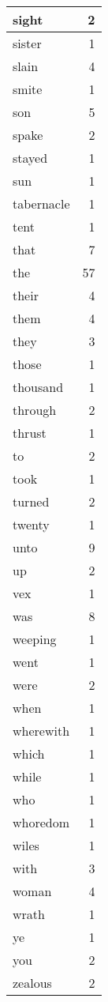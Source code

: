 \begin{center}
\begin{longtable}{l|r}
sight & 2\\ \hline 
sister & 1\\ \hline 
slain & 4\\ \hline 
smite & 1\\ \hline 
son & 5\\ \hline 
spake & 2\\ \hline 
stayed & 1\\ \hline 
sun & 1\\ \hline 
tabernacle & 1\\ \hline 
tent & 1\\ \hline 
that & 7\\ \hline 
the & 57\\ \hline 
their & 4\\ \hline 
them & 4\\ \hline 
they & 3\\ \hline 
those & 1\\ \hline 
thousand & 1\\ \hline 
through & 2\\ \hline 
thrust & 1\\ \hline 
to & 2\\ \hline 
took & 1\\ \hline 
turned & 2\\ \hline 
twenty & 1\\ \hline 
unto & 9\\ \hline 
up & 2\\ \hline 
vex & 1\\ \hline 
was & 8\\ \hline 
weeping & 1\\ \hline 
went & 1\\ \hline 
were & 2\\ \hline 
when & 1\\ \hline 
wherewith & 1\\ \hline 
which & 1\\ \hline 
while & 1\\ \hline 
who & 1\\ \hline 
whoredom & 1\\ \hline 
wiles & 1\\ \hline 
with & 3\\ \hline 
woman & 4\\ \hline 
wrath & 1\\ \hline 
ye & 1\\ \hline 
you & 2\\ \hline 
zealous & 2\\ \hline 
\end{longtable}
\end{center}



